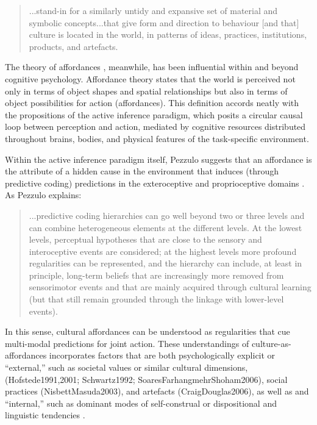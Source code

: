 \begin{CJK}{UTF8}{gbsn}
\begin{quotation}
  ...stand-in for a similarly untidy and expansive set of material and symbolic concepts...that give form and direction to behaviour [and that] culture is located in the world, in patterns of ideas, practices, institutions, products, and artefacts.
\end{quotation}


The theory of affordances \citep{Gibson1979}, meanwhile, has been influential within and beyond cognitive psychology.  Affordance theory states that the world is perceived not only in terms of object shapes and spatial relationships but also in terms of object possibilities for action (affordances).  This definition accords neatly with the propositions of the active inference paradigm, which posits a circular causal loop between perception and action, mediated by cognitive resources distributed throughout brains, bodies, and physical features of the task-specific environment.

Within the active inference paradigm itself, Pezzulo suggests that an affordance is the attribute of a hidden cause in the environment that induces (through predictive coding) predictions in the exteroceptive and proprioceptive domains \citep[908]{Pezzulo2013}.  As Pezzulo explains:

    \begin{quotation}
    ...predictive coding hierarchies can go well beyond two or three levels and can combine heterogeneous elements at the different levels.  At the lowest levels, perceptual hypotheses that are close to the sensory and interoceptive events are considered; at the highest levels more profound regularities can be represented, and the hierarchy can include, at least in principle, long-term beliefs that are increasingly more removed from sensorimotor events and that are mainly acquired through cultural learning (but that still remain grounded through the linkage with lower-level events).
    \end{quotation}

In this sense, cultural affordances can be understood as regularities that cue multi-modal predictions for joint action.
These understandings of culture-as-affordances incorporates factors that are both psychologically explicit or ``external,'' such as societal values or similar cultural dimensions, (Hofstede1991,2001; Schwartz1992; SoaresFarhangmehrShoham2006), social practices (NisbettMasuda2003), and artefacts (CraigDouglas2006), as well as and ``internal,'' such as dominant modes of self-construal or dispositional and linguistic tendencies \citep{Markus1991}.


\end{CJK}
